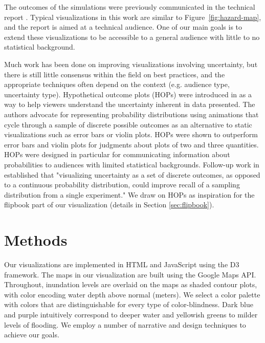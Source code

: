 \documentclass{vgtc}                          %
\begin{document}
The outcomes of the simulations were previously communicated in the technical report \cite{gonzalez2013probabilistic}. Typical visualizations in this work are similar to Figure~\ref{fig:hazard-map}, and the report is aimed at a technical audience. One of our main goals is to extend these visualizations to be accessible to a general audience with little to no statistical background.

Much work has been done on improving visualizations involving uncertainty, but there is still little consensus within the field on best practices, and the appropriate techniques often depend on the context (e.g. audience type, uncertainty type).
Hypothetical outcome plots (HOPs) were introduced in \cite{hypothetical} as a way to help viewers understand the uncertainty inherent in data presented. The authors advocate for representing probability distributions using animations that cycle through a sample of discrete possible outcomes as an alternative to static visualizations such as error bars or violin plots. HOPs were shown to outperform error bars and violin plots for judgments about plots of two and three quantities. HOPs were designed in particular for communicating information about probabilities to audiences with limited statistical backgrounds.
Follow-up work in \cite{hullman2018imagining} established that "visualizing uncertainty as a set of discrete outcomes, as opposed to a continuous
probability distribution, could improve recall of a sampling distribution from a single experiment."
We draw on HOPs as inspiration for the flipbook part of our visualization (details in Section \ref{sec:flipbook}).






\section{Methods}\label{sec:methods}
Our visualizations are implemented in HTML and JavaScript using the D3 framework. The maps in our visualization are built using the Google Maps API. Throughout, inundation levels are overlaid on the maps as shaded contour plots, with color encoding water depth above normal (meters). We select a color palette with colors that are distinguishable for every type of color-blindness. Dark blue and purple intuitively correspond to deeper water and yellowish greens to milder levels of flooding. We employ a number of narrative and design techniques to achieve our goals.
\end{document}
